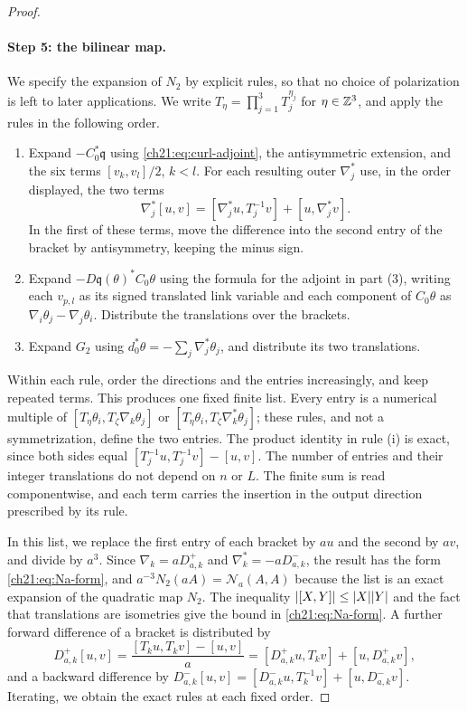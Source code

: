 \begin{proof}
\paragraph{Step 5: the bilinear map.}
We specify the expansion of $N_2$ by explicit rules, so that no choice of polarization is left to later applications. We write $T_\eta=\prod_{j=1}^3T_j^{\eta_j}$ for $\eta\in\mathbb Z^3$, and apply the rules in the following order.
\begin{enumerate}
\item[(i)] Expand $-C_0^*\mathfrak q$ using \eqref{ch21:eq:curl-adjoint}, the antisymmetric extension, and the six terms $[v_k,v_l]/2$, $k<l$. For each resulting outer $\nabla_j^*$ use, in the order displayed, the two terms
\[
 \nabla_j^*[u,v]=[\nabla_j^*u,T_j^{-1}v]+[u,\nabla_j^*v].
\]
In the first of these terms, move the difference into the second entry of the bracket by antisymmetry, keeping the minus sign.
\item[(ii)] Expand $-D\mathfrak q(\theta)^*C_0\theta$ using the formula for the adjoint in part (3), writing each $v_{p,l}$ as its signed translated link variable and each component of $C_0\theta$ as $\nabla_i\theta_j-\nabla_j\theta_i$. Distribute the translations over the brackets.
\item[(iii)] Expand $G_2$ using $d_0^*\theta=-\sum_j\nabla_j^*\theta_j$, and distribute its two translations.
\end{enumerate}
Within each rule, order the directions and the entries increasingly, and keep repeated terms. This produces one fixed finite list. Every entry is a numerical multiple of $[T_\eta\theta_i,T_\zeta\nabla_k\theta_j]$ or $[T_\eta\theta_i,T_\zeta\nabla_k^*\theta_j]$; these rules, and not a symmetrization, define the two entries. The product identity in rule (i) is exact, since both sides equal $[T_j^{-1}u,T_j^{-1}v]-[u,v]$. The number of entries and their integer translations do not depend on $n$ or $L$. The finite sum is read componentwise, and each term carries the insertion in the output direction prescribed by its rule.

In this list, we replace the first entry of each bracket by $au$ and the second by $av$, and divide by $a^3$. Since $\nabla_k=aD_{a,k}^+$ and $\nabla_k^*=-aD_{a,k}^-$, the result has the form \eqref{ch21:eq:Na-form}, and $a^{-3}N_2(aA)=\mathcal N_a(A,A)$ because the list is an exact expansion of the quadratic map $N_2$. The inequality $\lvert [X,Y]\rvert\le\lvert X\rvert\lvert Y\rvert$ and the fact that translations are isometries give the bound in \eqref{ch21:eq:Na-form}. A further forward difference of a bracket is distributed by
\[
 D_{a,k}^+[u,v]=\frac{[T_ku,T_kv]-[u,v]}{a}=[D_{a,k}^+u,T_kv]+[u,D_{a,k}^+v],
\]
and a backward difference by $D_{a,k}^-[u,v]=[D_{a,k}^-u,T_k^{-1}v]+[u,D_{a,k}^-v]$. Iterating, we obtain the exact rules at each fixed order.


\end{proof}
